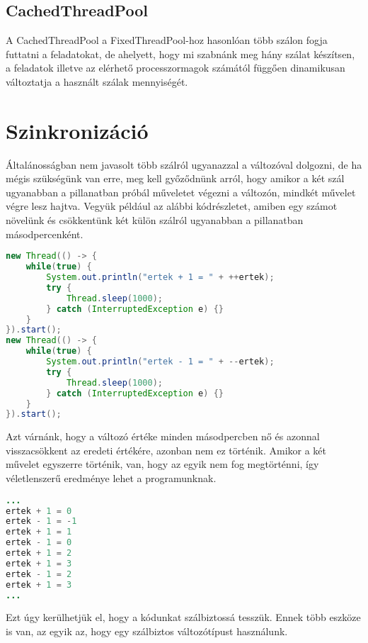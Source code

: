 \documentclass{article}
\begin{document}
\subsection{CachedThreadPool}

A CachedThreadPool a FixedThreadPool-hoz hasonlóan több szálon fogja futtatni a feladatokat, de ahelyett, hogy mi szabnánk meg hány szálat készítsen, a feladatok illetve az elérhető processzormagok számától függően dinamikusan változtatja a használt szálak mennyiségét.

\newpage

\section{Szinkronizáció}

Általánosságban nem javasolt több szálról ugyanazzal a változóval dolgozni, de ha mégis szükségünk van erre, meg kell győződnünk arról, hogy amikor a két szál ugyanabban a pillanatban próbál műveletet végezni a változón, mindkét művelet végre lesz hajtva. Vegyük például az alábbi kódrészletet, amiben egy számot növelünk és csökkentünk két külön szálról ugyanabban a pillanatban másodpercenként.

\begin{lstlisting}[language=Java, caption=Változó módosítása két szálról]
new Thread(() -> {
	while(true) {
		System.out.println("ertek + 1 = " + ++ertek);
		try {
			Thread.sleep(1000);
		} catch (InterruptedException e) {}
	}
}).start();
new Thread(() -> {
	while(true) {
		System.out.println("ertek - 1 = " + --ertek);
		try {
			Thread.sleep(1000);
		} catch (InterruptedException e) {}
	}
}).start();
\end{lstlisting}

Azt várnánk, hogy a változó értéke minden másodpercben nő és azonnal visszacsökkent az eredeti értékére, azonban nem ez történik. Amikor a két művelet egyszerre történik, van, hogy az egyik nem fog megtörténni, így véletlenszerű eredménye lehet a programunknak.

\begin{lstlisting}[language=Java, caption=Kimenet]
...
ertek + 1 = 0
ertek - 1 = -1
ertek + 1 = 1
ertek - 1 = 0
ertek + 1 = 2
ertek + 1 = 3
ertek - 1 = 2
ertek + 1 = 3
...
\end{lstlisting}

Ezt úgy kerülhetjük el, hogy a kódunkat szálbiztossá tesszük. Ennek több eszköze is van, az egyik az, hogy egy szálbiztos változótípust használunk.
\end{document}
